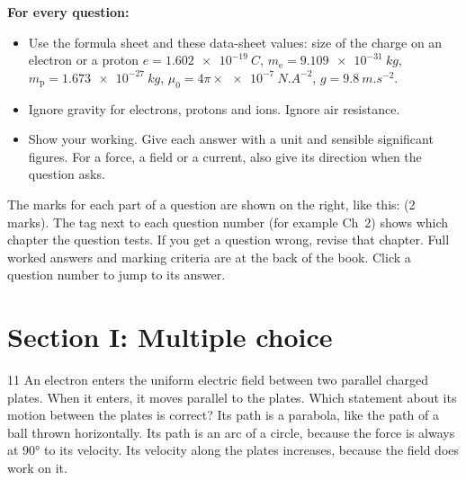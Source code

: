 \textbf{For every question:}
\begin{itemize}
  \item Use the formula sheet and these data-sheet values: size of the charge on an electron
        or a proton $e = \qty{1.602e-19}{C}$, $m_\mathrm{e} = \qty{9.109e-31}{kg}$,
        $m_\mathrm{p} = \qty{1.673e-27}{kg}$, $\mu_0 = 4\pi \times \qty{e-7}{N.A^{-2}}$,
        $g = \qty{9.8}{m.s^{-2}}$.
  \item Ignore gravity for electrons, protons and ions. Ignore air resistance.
  \item Show your working. Give each answer with a unit and sensible significant figures.
        For a force, a field or a current, also give its direction when the question asks.
\end{itemize}

The marks for each part of a question are shown on the right, like this:
\textcolor{hscmuted}{\small(2 marks)}. The tag next to each question number (for example
\textcolor{hscbrand}{Ch~2}) shows which chapter the question tests. If you get a question
wrong, revise that chapter. Full worked answers and marking criteria are at the back of the
book. Click a question number to jump to its answer.

\section*{Section I: Multiple choice}

\begin{practiceq}{1}{1}\label{pq:platepath}
An electron enters the uniform electric field between two parallel charged plates. When it
enters, it moves parallel to the plates. Which statement about its motion between the plates
is correct?
  {Its path is a parabola, like the path of a ball thrown horizontally.}
  {Its path is an arc of a circle, because the force is always at \ang{90} to its velocity.}
  {Its velocity along the plates increases, because the field does work on it.}
\end{practiceq}

